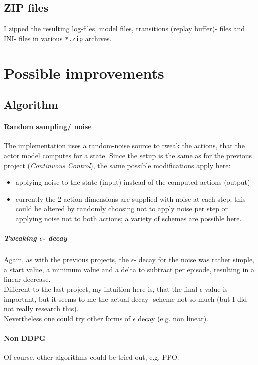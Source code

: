\documentclass[a4paper]{article}
\begin{document}
\subsection{ZIP files}
I zipped the resulting log-files, model files, transitions (replay buffer)- files
and INI- files in various \texttt{*.zip} archives.

\section{Possible improvements}
\subsection{Algorithm}
\paragraph{Random sampling/ noise}
The implementation uses a random-noise source to tweak the actions, that the
actor model computes for a state. Since the setup is the same as for the
previous project (\textit{Continuous Control}), the same possible modifications
apply here:
\begin{itemize}
\item applying noise to the state (input) instead of the computed actions (output)
\item currently the 2 action dimensions are supplied with noise at each step;
this could be altered by randomly choosing not to apply noise per step or
applying noise not to both actions; a variety of schemes are possible here.
\end{itemize}

\subparagraph{Tweaking $\epsilon$- decay}
Again, as with the previous projects, the $\epsilon$- decay for the noise
was rather simple, a start value, a minimum value and a delta to subtract per episode,
resulting in a linear decrease.
\\
Different to the last project, my intuition here is, that the final
$\epsilon$ value is important, but it seems to me the actual decay- scheme
not so much (but I did not really research this).\\
Nevertheless one could try other forms of $\epsilon$ decay (e.g. non linear).

\paragraph{Non DDPG}
Of course, other algorithms could be tried out, e.g. PPO.
\end{document}
